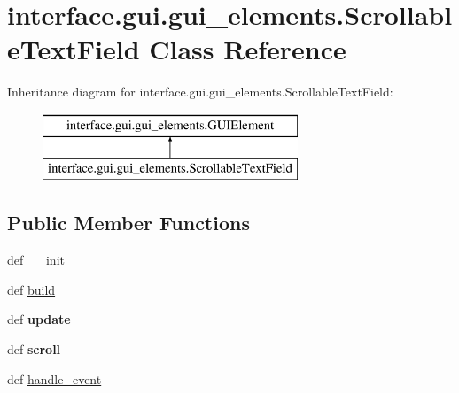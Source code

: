 \hypertarget{classinterface_1_1gui_1_1gui__elements_1_1_scrollable_text_field}{\section{interface.\-gui.\-gui\-\_\-elements.\-Scrollable\-Text\-Field \-Class \-Reference}
\label{classinterface_1_1gui_1_1gui__elements_1_1_scrollable_text_field}
}
\-Inheritance diagram for interface.\-gui.\-gui\-\_\-elements.\-Scrollable\-Text\-Field\-:\begin{figure}[H]
\begin{center}
\leavevmode
\includegraphics[height=2.000000cm]{classinterface_1_1gui_1_1gui__elements_1_1_scrollable_text_field}
\end{center}
\end{figure}
\subsection*{\-Public \-Member \-Functions}
\begin{DoxyCompactItemize}
\item 
def \hyperlink{classinterface_1_1gui_1_1gui__elements_1_1_scrollable_text_field_ab168282307e264c27ede24696cb0fd32}{\-\_\-\-\_\-init\-\_\-\-\_\-}
\item 
def \hyperlink{classinterface_1_1gui_1_1gui__elements_1_1_scrollable_text_field_ad56568e8932a0f20709fe1ccebf26b3b}{build}
\item 
\hypertarget{classinterface_1_1gui_1_1gui__elements_1_1_scrollable_text_field_a2c8435ec76c6e54c417b070b9a87013c}{def {\bfseries update}}\label{classinterface_1_1gui_1_1gui__elements_1_1_scrollable_text_field_a2c8435ec76c6e54c417b070b9a87013c}

\item 
\hypertarget{classinterface_1_1gui_1_1gui__elements_1_1_scrollable_text_field_a7b676dab1440746d8108a12b1cdf30ef}{def {\bfseries scroll}}\label{classinterface_1_1gui_1_1gui__elements_1_1_scrollable_text_field_a7b676dab1440746d8108a12b1cdf30ef}

\item 
def \hyperlink{classinterface_1_1gui_1_1gui__elements_1_1_scrollable_text_field_aebd94660e224c2eb5026e6d5287b92fc}{handle\-\_\-event}
\end{DoxyCompactItemize}
